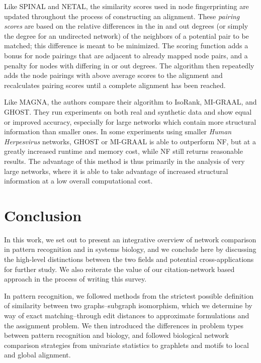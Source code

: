 \documentclass[12pt]{thesis}
\theoremstyle{plain}
\theoremstyle{definition}
\theoremstyle{remark}
\begin{document}
Like SPINAL and NETAL, the similarity scores used in node fingerprinting are updated throughout the process of constructing an alignment. These \textit{pairing scores} are based on the relative differences in the in and out degrees (or simply the degree for an undirected network) of the neighbors of a potential pair to be matched; this difference is meant to be minimized. The scoring function adds a bonus for node pairings that are adjacent to already mapped node pairs, and a penalty for nodes with differing in or out degrees. The algorithm then repeatedly adds the node pairings with above average scores to the alignment and recalculates pairing scores until a complete alignment has been reached.

Like MAGNA, the authors compare their algorithm to IsoRank, MI-GRAAL, and GHOST. They run experiments on both real and synthetic data and show equal or improved accuracy, especially for large networks which contain more structural information than smaller ones. In some experiments using smaller \textit{Human Herpesvirus} networks, GHOST or MI-GRAAL is able to outperform NF, but at a greatly increased runtime and memory cost, while NF still returns reasonable results. The advantage of this method is thus primarily in the analysis of very large networks, where it is able to take advantage of increased structural information at a low overall computational cost.








\chapter{Conclusion}

In this work, we set out to present an integrative overview of network comparison in pattern recognition and in systems biology, and we conclude here by discussing the high-level distinctions between the two fields and potential cross-applications for further study. We also reiterate the value of our citation-network based approach in the process of writing this survey.

In pattern recognition, we followed methods from the strictest possible definition of similarity between two graphs--subgraph isomorphism, which we determine by way of exact matching--through edit distances to approximate formulations and the assignment problem. We then introduced the differences in problem types between pattern recognition and biology, and followed biological network comparison strategies from univariate statistics to graphlets and motifs to local and global alignment.
\end{document}

